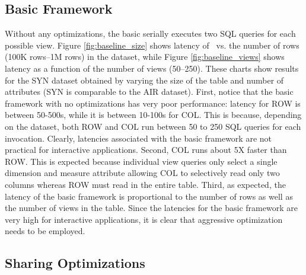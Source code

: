 \subsection{Basic {\large \SeeDB} Framework}
\label{sec:basic_framework_expts}

Without any optimizations, the basic \SeeDB
serially executes two SQL queries for each
possible view.
Figure \ref{fig:baseline_size} shows latency of \SeeDB\ vs. the number of rows (100K rows--1M rows) 
in the dataset, while Figure \ref{fig:baseline_views} shows latency as a function 
of the number of views (50--250).
These charts show results for the SYN dataset obtained by varying the size of the
table and number of attributes (SYN is comparable to the AIR dataset).
First, notice that the basic framework with no optimizations has very 
poor performance: latency for ROW is between 50-500s, 
while it is between 10-100s for COL. 
This is because, depending on the dataset, both ROW and COL run between 50 to 250 SQL queries 
for each \SeeDB invocation.
Clearly, latencies associated with the basic \SeeDB framework are not practical for interactive 
applications. 
Second, COL runs about 5X faster than ROW. 
This is expected because individual view queries only select a single dimension and measure
attribute allowing COL to selectively read only two columns whereas ROW must read in the entire table.
Third, as expected, the latency of the
basic framework is proportional to the number of rows as well as the 
number of views in the table.
Since the latencies for the basic framework are very high for interactive
applications, it is clear that aggressive optimization needs to be employed.

\subsection{Sharing Optimizations}
\label{sec:expts_dbms_execution_engine}

